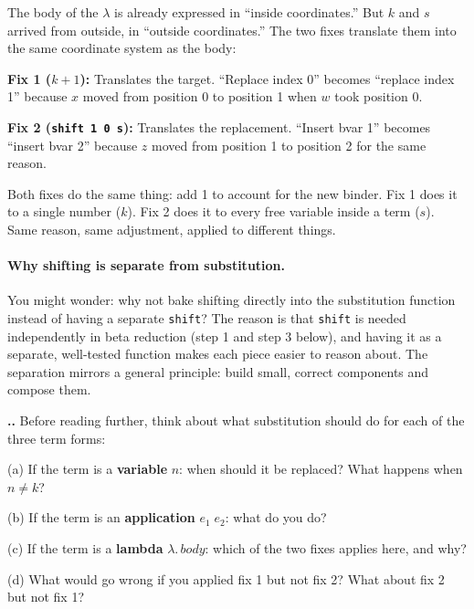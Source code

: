 \documentclass[11pt,a4paper]{article}
\newcounter{exercise}[section]
\renewcommand{\theexercise}{\thesection.\arabic{exercise}}
\theoremstyle{definition}
\newcommand{\lam}{\lambda}
\begin{document}
\begin{intuition}
The body of the $\lam$ is already expressed in ``inside coordinates.'' But
$k$ and $s$ arrived from outside, in ``outside coordinates.'' The two fixes
translate them into the same coordinate system as the body:

\textbf{Fix 1 ($k + 1$):} Translates the target. ``Replace index 0'' becomes
``replace index 1'' because $x$ moved from position 0 to position 1 when
$w$ took position 0.

\textbf{Fix 2 (\texttt{shift 1 0 s}):} Translates the replacement. ``Insert
bvar 1'' becomes ``insert bvar 2'' because $z$ moved from position 1 to
position 2 for the same reason.

Both fixes do the same thing: add 1 to account for the new binder. Fix 1
does it to a single number ($k$). Fix 2 does it to every free variable
inside a term ($s$). Same reason, same adjustment, applied to different things.
\end{intuition}

\paragraph{Why shifting is separate from substitution.}

You might wonder: why not bake shifting directly into the substitution function
instead of having a separate \texttt{shift}? The reason is that
\texttt{shift} is needed independently in beta reduction (step 1 and step 3
below), and having it as a separate, well-tested function makes each piece
easier to reason about. The separation mirrors a general principle: build
small, correct components and compose them.

\begin{exercisebox}
\textbf{\theexercise.}\; Before reading further, think about what substitution should do for each of the three term forms:

(a) If the term is a \textbf{variable} $n$: when should it be replaced? What happens when $n \neq k$?

(b) If the term is an \textbf{application} $e_1\;e_2$: what do you do?

(c) If the term is a \textbf{lambda} $\lam.\,\mathit{body}$: which of the two fixes applies here, and why?

(d) What would go wrong if you applied fix 1 but not fix 2? What about fix 2 but not fix 1?
\end{exercisebox}
\end{document}
